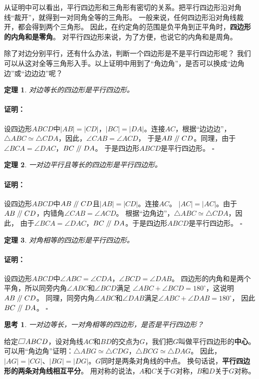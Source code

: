 \documentclass[12pt,UTF8]{ctexbook}
\newtheorem{tm}{定理}[section]
\newtheorem{sk}{思考}[section]
\newenvironment{proof2}{\paragraph{\textbf{证明：}}}{\hfill$\square$}
\renewcommand\parallel{\mathrel{/\mskip-4mu/}}
\newcommand\parasbx{%
    \mathord{\text{%
        \tikz[baseline] \draw (0,.1ex) -- (.8em,.1ex) -- (1em,1.6ex) -- (.2em,1.6ex) -- cycle;}}}
\begin{document}
从证明中可以看出，平行四边形和三角形有密切的关系。把平行四边形沿对角线“裁开”，就得到一对同角全等的三角形。
一般来说，任何四边形沿对角线裁开，都会得到两个三角形。
因此，在约定角的范围是负平角到正平角时，\textbf{四边形的内角和是零角}。
对平行四边形来说，为了方便，也说它的内角和是周角。

除了对边分别平行，还有什么办法，判断一个四边形是不是平行四边形呢？
我们可以从这对全等三角形入手。以上证明中用到了“角边角”，是否可以换成“边角边”或“边边边”呢？

\begin{tm}\label{tm:0-0-1}
    对边等长的四边形是平行四边形。
\end{tm}
\begin{proof2}
    设四边形$ABCD$中$|AB| = |CD|$，$|BC| = |DA|$。连接$AC$，根据“边边边”，
    $\triangle ABC \simeq \triangle CDA$，因此，$\angle CAB = \angle ACD$，
    于是$AB \parallel CD$。同理，由于$\angle BCA = \angle DAC$，$BC \parallel DA$。
    于是四边形$ABCD$是平行四边形。
\end{proof2}

\begin{tm}\label{tm:0-0-2}
    一对边平行且等长的四边形是平行四边形。
\end{tm}
\begin{proof2}
    设四边形$ABCD$中$AB \parallel CD$且$|AB| = |CD|$。连接$AC$。
    $|AC| = |AC|$。由于$AB \parallel CD$，内错角$\angle CAB = \angle ACD$。
    根据“边角边”，$\triangle ABC \simeq \triangle CDA$，因此，
    由于$\angle BCA = \angle DAC$，$BC \parallel DA$。于是四边形$ABCD$是平行四边形。
\end{proof2}

\begin{tm}\label{tm:0-0-3}
    对角相等的四边形是平行四边形。
\end{tm}
\begin{proof2}
    设四边形$ABCD$中$\angle ABC = \angle CDA$，$\angle BCD = \angle DAB$。
    四边形的内角和是两个平角，所以同旁内角$\angle ABC$和$\angle BCD$满足
    $\angle ABC + \angle BCD = 180^\circ$，这说明$AB \parallel CD$。
    同理，同旁内角$\angle ABC$和$\angle DAB$满足$\angle ABC + \angle DAB = 180^\circ$，
    因此$BC \parallel DA$。
\end{proof2}

\begin{sk}\label{sk:0-0-0}
    一对边等长，一对角相等的四边形，是否是平行四边形？
\end{sk}

给定$\parasbx ABCD$，设对角线$AC$和$BD$的交点为$G$，我们把$G$叫做平行四边形的\textbf{中心}。
可以用“角边角”证明：$\triangle ABG \simeq \triangle CDG$，$\triangle BCG \simeq \triangle DAG$。
因此，$|AG| = |CG|$、$|BG| = |DG|$。$G$同时是两条对角线的中点。
换句话说，\textbf{平行四边形的两条对角线相互平分}。
用对称的说法，$A$和$C$关于$G$对称，$B$和$D$关于$G$对称。
\end{document}
